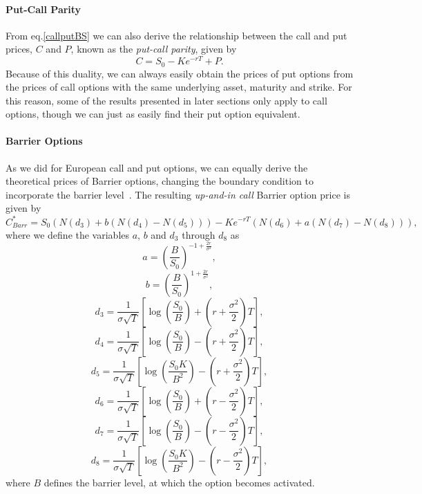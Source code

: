 \paragraph{Put-Call Parity}
From eq.\eqref{callputBS} we can also derive the relationship between the call and put prices, $C$ and $P$, known as the \emph{put-call parity}, given by
\begin{equation}
C=S_0-Ke^{-rT}+P.
\end{equation}
\noindent Because of this duality, we can always easily obtain the prices of put options from the prices of call options with the same underlying asset, maturity and strike. For this reason, some of the results presented in later sections only apply to call options, though we can just as easily find their put option equivalent.


\paragraph{Barrier Options}
As we did for European call and put options, we can equally derive the theoretical prices of Barrier options, changing the boundary condition to incorporate the barrier level~\citep{taleb}. The resulting \emph{up-and-in call} Barrier option price is given by
\begin{equation}\label{barr1}
C_{Barr}^*=S_0\left(N(d_3)+b\left(N(d_4)-N(d_5)\right)\right)-Ke^{-rT}\left(N(d_6)+a\left(N(d_7)-N(d_8)\right)\right),
\end{equation}
\noindent where we define the variables $a$, $b$ and $d_3$ through $d_8$ as
\begin{equation}
a=\left(\frac{B}{S_0}\right)^{-1+\frac{2r}{\sigma^2}},
\end{equation}
\begin{equation}
b=\left(\frac{B}{S_0}\right)^{1+\frac{2r}{\sigma^2}},
\end{equation}
\begin{equation}
d_3=\frac{1}{\sigma\sqrt{T}}\left[\log\left(\frac{S_0}{B}\right)+\left(r+\frac{\sigma^2}{2}\right)T\right],
\end{equation}
\begin{equation}
d_4=\frac{1}{\sigma\sqrt{T}}\left[\log\left(\frac{S_0}{B}\right)-\left(r+\frac{\sigma^2}{2}\right)T\right],
\end{equation}
\begin{equation}
d_5=\frac{1}{\sigma\sqrt{T}}\left[\log\left(\frac{S_0K}{B^2}\right)-\left(r+\frac{\sigma^2}{2}\right)T\right],
\end{equation}
\begin{equation}
d_6=\frac{1}{\sigma\sqrt{T}}\left[\log\left(\frac{S_0}{B}\right)+\left(r-\frac{\sigma^2}{2}\right)T\right],
\end{equation}
\begin{equation}
d_7=\frac{1}{\sigma\sqrt{T}}\left[\log\left(\frac{S_0}{B}\right)-\left(r-\frac{\sigma^2}{2}\right)T\right],
\end{equation}
\begin{equation}
d_8=\frac{1}{\sigma\sqrt{T}}\left[\log\left(\frac{S_0K}{B^2}\right)-\left(r-\frac{\sigma^2}{2}\right)T\right],
\end{equation}
\noindent where $B$ defines the barrier level, at which the option becomes activated.

